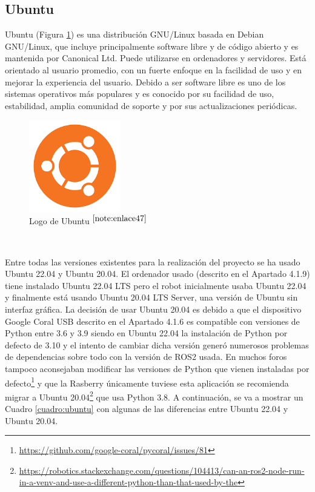 \setcounter{footnote}{46} %


\subsection{Ubuntu}

Ubuntu (Figura \ref{fig:ubuntu}) es una distribución GNU/Linux basada en Debian GNU/Linux, que incluye principalmente software libre y de código abierto y es mantenida por Canonical Ltd. Puede utilizarse en ordenadores y servidores. Está orientado al usuario promedio, con un fuerte enfoque en la facilidad de uso y en mejorar la experiencia del usuario. Debido a ser software libre es uno de los sistemas operativos más populares y es conocido por su facilidad de uso, estabilidad, amplia comunidad de soporte y por sus actualizaciones periódicas.

\begin{figure} [h!]
	\begin{center}
		\includegraphics[width=4cm]{figs/ubuntu.png}
	\end{center}
	\caption{Logo de Ubuntu $^{\ref{note:enlace47}}$} 
	\label{fig:ubuntu}
\end{figure}\

\setcounter{footnote}{47} %

Entre todas las versiones existentes para la realización del proyecto se ha usado Ubuntu 22.04 y Ubuntu 20.04. El ordenador usado (descrito en el Apartado 4.1.9) tiene instalado Ubuntu 22.04 \ac{LTS} pero el robot inicialmente usaba Ubuntu 22.04 y finalmente está usando Ubuntu 20.04 \acs{LTS} Server, una versión de Ubuntu sin interfaz gráfica. La decisión de usar Ubuntu 20.04 es debido a que el dispositivo Google Coral USB descrito en el Apartado 4.1.6 es compatible con versiones de Python entre 3.6 y 3.9 siendo en Ubuntu 22.04 la instalación de Python por defecto de 3.10 y el intento de cambiar dicha versión generó numerosos problemas de dependencias sobre todo con la versión de ROS2 usada. En muchos foros tampoco aconsejaban modificar las versiones de Python que vienen instaladas por defecto\footnote{\url{https://github.com/google-coral/pycoral/issues/81}} y que la Rasberry únicamente tuviese esta aplicación se recomienda migrar a Ubuntu 20.04\footnote{\url{https://robotics.stackexchange.com/questions/104413/can-an-ros2-node-run-in-a-venv-and-use-a-different-python-than-that-used-by-the}} que usa Python 3.8. A continuación, se va a mostrar un Cuadro \ref{cuadro:ubuntu} con algunas de las diferencias entre Ubuntu 22.04 y Ubuntu 20.04.


